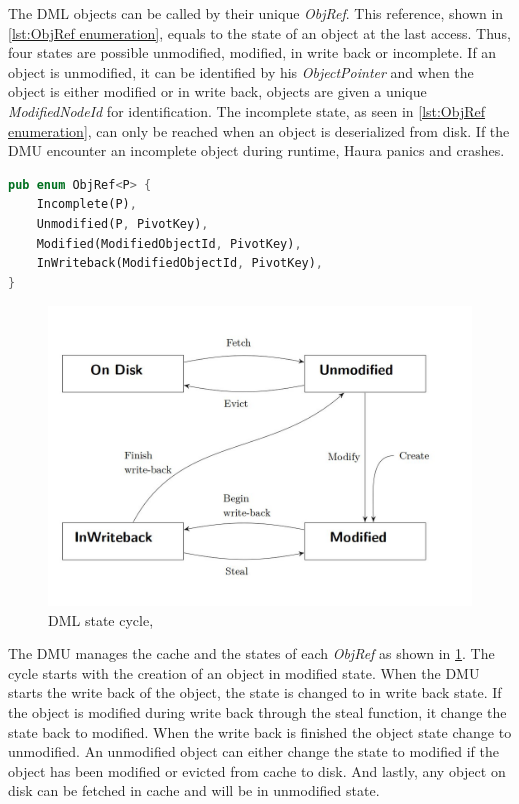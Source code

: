 \documentclass[
	12pt,
	a4paper,
	abstract,
	bibliography=totoc,
	chapterprefix,
	headings=openright,
	numbers=endperiod,
	parskip=half,
	twoside,
]{scrreprt}
\begin{document}
The DML objects can be called by their unique \emph{ObjRef}.
This reference, shown in \cref{lst:ObjRef enumeration}, equals to the state of an object at the last access.
Thus, four states are possible unmodified, modified, in write back or incomplete.
If an object is unmodified, it can be identified by his \emph{ObjectPointer} and
when the object is either modified or in write back, objects are given a unique \emph{ModifiedNodeId} for identification.
The incomplete state, as seen in \cref{lst:ObjRef enumeration}, can only be reached when an object is deserialized from disk.
If the DMU encounter an incomplete object during runtime, Haura panics and crashes.

\bigskip

\begin{lstlisting}[language=Rust,mathescape=true,caption={ObjRef enumeration, parameter P equals ObjectPointer<D>},
	label=lst:ObjRef enumeration]
pub enum ObjRef<P> {
    Incomplete(P),
    Unmodified(P, PivotKey),
    Modified(ModifiedObjectId, PivotKey),
    InWriteback(ModifiedObjectId, PivotKey),
}
\end{lstlisting}

\begin{figure}[ht]
	\centering
	\includegraphics[scale=0.4]{DML_state_cycle.jpg}
	\caption{DML state cycle, \cite{wiedemann2018modern}}
		\label{fig:DML state cycle}
\end{figure}

The DMU manages the cache and the states of each \emph{ObjRef} as shown in \ref{fig:DML state cycle}.
The cycle starts with the creation of an object in modified state. When the DMU starts the write back of the object, the state
is changed to in write back state.
If the object is modified during write back through the steal function, it change the state back to modified.
When the write back is finished the object state change to unmodified.
An unmodified object can either change the state to modified if the object has been modified or evicted from cache to disk.
And lastly, any object on disk can be fetched in cache and will be in unmodified state.
\end{document}
